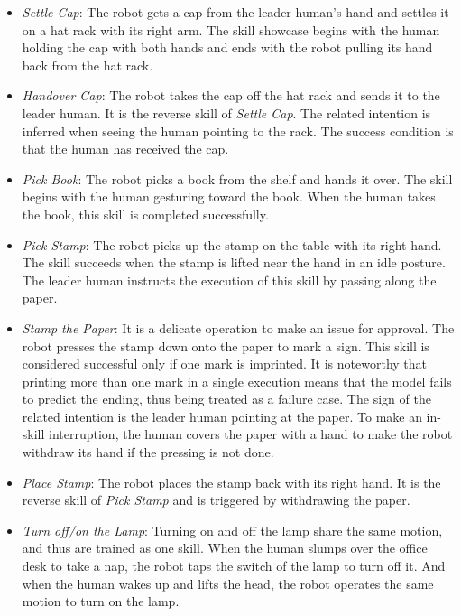 \begin{itemize}[leftmargin=*]

\item \textit{Settle Cap}: The robot gets a cap from the leader human's hand and settles it on a hat rack with its right arm.
The skill showcase begins with the human holding the cap with both hands and ends with the robot pulling its hand back from the hat rack.

\item \textit{Handover Cap}: The robot takes the cap off the hat rack and sends it to the leader human.
It is the reverse skill of \textit{Settle Cap}.
The related intention is inferred when seeing the human pointing to the rack.
The success condition is that the human has received the cap.

\item \textit{Pick Book}: The robot picks a book from the shelf and hands it over.
The skill begins with the human gesturing toward the book.
When the human takes the book, this skill is completed successfully.

\item \textit{Pick Stamp}: The robot picks up the stamp on the table with its right hand. 
The skill succeeds when the stamp is lifted near the hand in an idle posture.
The leader human instructs the execution of this skill by passing along the paper.

\item \textit{Stamp the Paper}: It is a delicate operation to make an issue for approval.
The robot presses the stamp down onto the paper to mark a sign.
This skill is considered successful only if one mark is imprinted.
It is noteworthy that printing more than one mark in a single execution means that the model fails to predict the ending, thus being treated as a failure case.
The sign of the related intention is the leader human pointing at the paper.
To make an in-skill interruption, the human covers the paper with a hand to make the robot withdraw its hand if the pressing is not done.

\item \textit{Place Stamp}: The robot places the stamp back with its right hand.
It is the reverse skill of \textit{Pick Stamp} and is triggered by withdrawing the paper.

\item \textit{Turn off/on the Lamp}: Turning on and off the lamp share the same motion, and thus are trained as one skill.
When the human slumps over the office desk to take a nap, the robot taps the switch of the lamp to turn off it.
And when the human wakes up and lifts the head, the robot operates the same motion to turn on the lamp.
    
\end{itemize}

